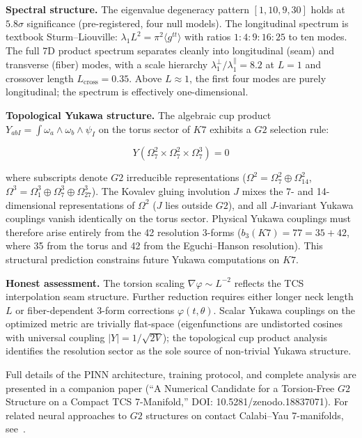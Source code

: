 \documentclass[11pt,a4paper]{article}
\newcommand{\Gtwo}{\mathrm{G}_2}
\newcommand{\Kseven}{K_7}
\def\Gtwo{G2}%
\def\Kseven{K7}%
\begin{document}
\textbf{Spectral structure.} The eigenvalue degeneracy pattern $[1, 10, 9, 30]$ holds at $5.8\sigma$ significance (pre-registered, four null models). The longitudinal spectrum is textbook Sturm--Liouville: $\lambda_1 L^2 = \pi^2\langle g^{tt}\rangle$ with ratios $1:4:9:16:25$ to ten modes. The full 7D product spectrum separates cleanly into longitudinal (seam) and transverse (fiber) modes, with a scale hierarchy $\lambda_1^\perp/\lambda_1^\parallel = 8.2$ at $L = 1$ and crossover length $L_{\mathrm{cross}} = 0.35$. Above $L \approx 1$, the first four modes are purely longitudinal; the spectrum is effectively one-dimensional.

\textbf{Topological Yukawa structure.} The algebraic cup product $Y_{abI} = \int \omega_a \wedge \omega_b \wedge \psi_I$ on the torus sector of $\Kseven$ exhibits a $\Gtwo$ selection rule:

$$Y(\Omega^2_7 \times \Omega^2_7 \times \Omega^3_7) = 0$$

where subscripts denote $\Gtwo$ irreducible representations ($\Omega^2 = \Omega^2_7 \oplus \Omega^2_{14}$, $\Omega^3 = \Omega^3_1 \oplus \Omega^3_7 \oplus \Omega^3_{27}$). The Kovalev gluing involution $J$ mixes the 7- and 14-dimensional representations of $\Omega^2$ ($J$ lies outside $\Gtwo$), and all $J$-invariant Yukawa couplings vanish identically on the torus sector. Physical Yukawa couplings must therefore arise entirely from the 42 resolution 3-forms ($b_3(\Kseven) = 77 = 35 + 42$, where 35 from the torus and 42 from the Eguchi--Hanson resolution). This structural prediction constrains future Yukawa computations on $\Kseven$.

\textbf{Honest assessment.} The torsion scaling $\nabla\varphi \sim L^{-2}$ reflects the TCS interpolation seam structure. Further reduction requires either longer neck length $L$ or fiber-dependent 3-form corrections $\varphi(t,\theta)$. Scalar Yukawa couplings on the optimized metric are trivially flat-space (eigenfunctions are undistorted cosines with universal coupling $|Y| = 1/\sqrt{2V}$); the topological cup product analysis identifies the resolution sector as the sole source of non-trivial Yukawa structure.

Full details of the PINN architecture, training protocol, and complete analysis are presented in a companion paper (``A Numerical Candidate for a Torsion-Free $\Gtwo$ Structure on a Compact TCS 7-Manifold,'' DOI: 10.5281/zenodo.18837071). For related neural approaches to $\Gtwo$ structures on contact Calabi--Yau 7-manifolds, see~\cite{heyes2025}.
\end{document}
